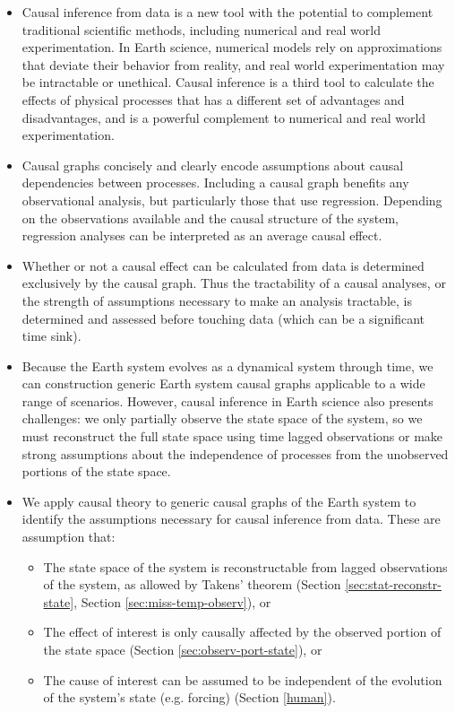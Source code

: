 \documentclass[12pt]{article}
\begin{document}
\begin{itemize}
\item Causal inference from data is a new tool with the potential to
  complement traditional scientific methods, including numerical and
  real world experimentation. In Earth science, numerical models rely
  on approximations that deviate their behavior from reality, and real
  world experimentation may be intractable or unethical. Causal
  inference is a third tool to calculate the effects of physical
  processes that has a different set of advantages and
  disadvantages, and is a powerful complement to numerical and real
  world experimentation.
\item Causal graphs concisely and clearly encode assumptions about
  causal dependencies between processes. Including a causal graph
  benefits any observational analysis, but particularly those that use
  regression. Depending on the observations available and the causal
  structure of the system, regression analyses can be interpreted as
  an average causal effect.
\item Whether or not a causal effect can be calculated from data is
  determined exclusively by the causal graph. Thus the tractability of
  a causal analyses, or the strength of assumptions necessary to make
  an analysis tractable, is determined and assessed before touching
  data (which can be a significant time sink).
\item Because the Earth system evolves as a dynamical system through
  time, we can construction generic Earth system causal graphs
  applicable to a wide range of scenarios. However, causal inference
  in Earth science also presents challenges: we only partially observe
  the state space of the system, so we must reconstruct the full state
  space using time lagged observations or make strong assumptions
  about the independence of processes from the unobserved portions of
  the state space.
\item We apply causal theory to generic causal graphs of the Earth
  system to identify the assumptions necessary for causal inference
  from data. These are assumption that:
  \begin{itemize}
  \item The state space of the system is reconstructable
    from lagged observations of the system, as allowed by
    Takens' theorem (Section \ref{sec:stat-reconstr-state}, Section \ref{sec:miss-temp-observ}), or
  \item The effect of interest is only causally
    affected by the observed portion of the state space (Section
    \ref{sec:observ-port-state}), or
  \item The cause of interest can be assumed to be independent of the
    evolution of the system's state (e.g. forcing) (Section
    \ref{human}).
  \end{itemize}
\end{itemize}
\end{document}
